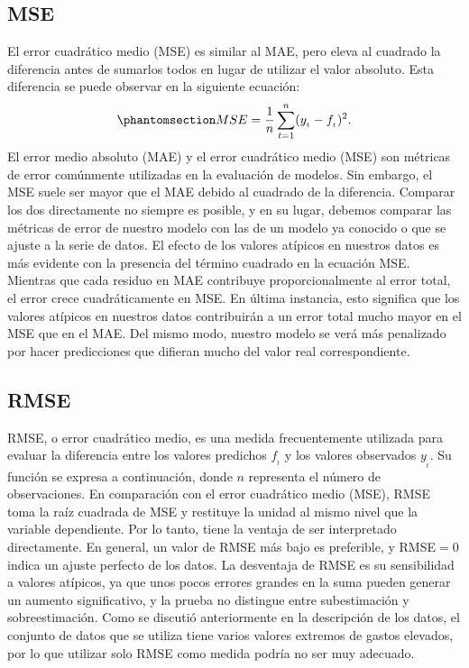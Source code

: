 \documentclass[
  us-letterpaper,
]{scrreprt}
\theoremstyle{plain}
\theoremstyle{definition}
\theoremstyle{definition}
\theoremstyle{plain}
\theoremstyle{remark}
\begin{document}
\subsection{MSE}\label{mse}

El error cuadrático medio (MSE) es similar al MAE, pero eleva al
cuadrado la diferencia antes de sumarlos todos en lugar de utilizar el
valor absoluto. Esta diferencia se puede observar en la siguiente
ecuación:
\begin{equation}\phantomsection\label{eq-MSE}{MSE=\frac{1}{n} \sum_{t=1}^n (y_{_t}-f_{_t})^2.}\end{equation}
El error medio absoluto (MAE) y el error cuadrático medio (MSE) son
métricas de error comúnmente utilizadas en la evaluación de modelos. Sin
embargo, el MSE suele ser mayor que el MAE debido al cuadrado de la
diferencia. Comparar los dos directamente no siempre es posible, y en su
lugar, debemos comparar las métricas de error de nuestro modelo con las
de un modelo ya conocido o que se ajuste a la serie de datos. El efecto
de los valores atípicos en nuestros datos es más evidente con la
presencia del término cuadrado en la ecuación MSE. Mientras que cada
residuo en MAE contribuye proporcionalmente al error total, el error
crece cuadráticamente en MSE. En última instancia, esto significa que
los valores atípicos en nuestros datos contribuirán a un error total
mucho mayor en el MSE que en el MAE. Del mismo modo, nuestro modelo se
verá más penalizado por hacer predicciones que difieran mucho del valor
real correspondiente.

\subsection{RMSE}\label{rmse}

RMSE, o error cuadrático medio, es una medida frecuentemente utilizada
para evaluar la diferencia entre los valores predichos \(f_{_t}\) y los
valores observados \(y_{_t}\). Su función se expresa a continuación,
donde \(n\) representa el número de observaciones. En comparación con el
error cuadrático medio (MSE), RMSE toma la raíz cuadrada de MSE y
restituye la unidad al mismo nivel que la variable dependiente. Por lo
tanto, tiene la ventaja de ser interpretado directamente. En general, un
valor de RMSE más bajo es preferible, y RMSE\(=0\) indica un ajuste
perfecto de los datos. La desventaja de RMSE es su sensibilidad a
valores atípicos, ya que unos pocos errores grandes en la suma pueden
generar un aumento significativo, y la prueba no distingue entre
subestimación y sobreestimación. Como se discutió anteriormente en la
descripción de los datos, el conjunto de datos que se utiliza tiene
varios valores extremos de gastos elevados, por lo que utilizar solo
RMSE como medida podría no ser muy adecuado.
\end{document}
